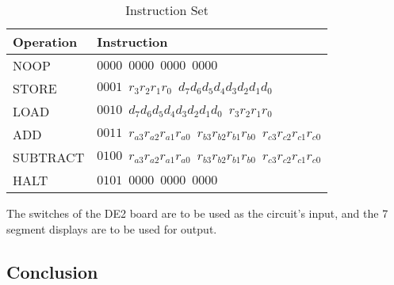 \documentclass[12pt]{article}
\begin{document}
\begin{table}[htbp]
    \centering
    \begin{tabular}{ll}                                                                                                                 \\\toprule
        \textbf{Operation}  & \textbf{Instruction}                                                                                      \\\midrule
        NOOP                & $0000 \;\: 0000 \;\: 0000 \;\: 0000$                                                                      \\
        STORE               & $0001 \;\: r_3 r_2 r_1 r_0 \;\: d_7 d_6 d_5 d_4 d_3 d_2 d_1 d_0$                                          \\
        LOAD                & $0010 \;\: d_7 d_6 d_5 d_4 d_3 d_2 d_1 d_0 \;\: r_3 r_2 r_1 r_0$                                          \\
        ADD                 & $0011 \;\: r_{a3} r_{a2} r_{a1} r_{a0} \;\: r_{b3} r_{b2} r_{b1} r_{b0} \;\: r_{c3} r_{c2} r_{c1} r_{c0}$ \\
        SUBTRACT            & $0100 \;\: r_{a3} r_{a2} r_{a1} r_{a0} \;\: r_{b3} r_{b2} r_{b1} r_{b0} \;\: r_{c3} r_{c2} r_{c1} r_{c0}$ \\
        HALT                & $0101 \;\: 0000 \;\: 0000 \;\: 0000$                                                                      \\\bottomrule
    \end{tabular}
    \caption{Instruction Set}
    \label{tab:instructions}
\end{table}

The switches of the DE2 board are to be used as the circuit’s input, and the 7 segment displays are to be used for output.

\FloatBarrier  \FloatBarrier \clearpage
\FloatBarrier  \FloatBarrier \clearpage
\FloatBarrier  \FloatBarrier \clearpage
\FloatBarrier  \FloatBarrier \clearpage
\FloatBarrier  \FloatBarrier \clearpage

\subsection*{Conclusion} 

\clearpage
\FloatBarrier 
\end{document}
